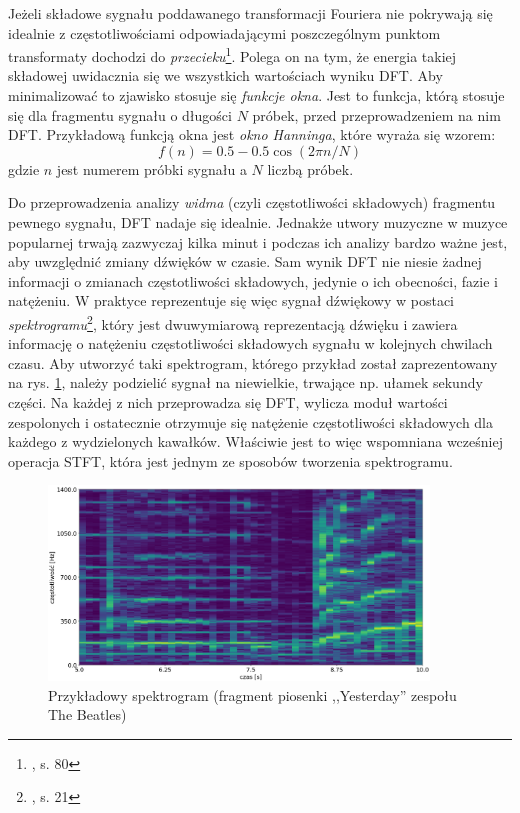 Jeżeli składowe sygnału poddawanego transformacji Fouriera nie pokrywają się idealnie z częstotliwościami odpowiadającymi poszczególnym punktom transformaty dochodzi do \emph{przecieku}\footnote{\cite{lyons_wprowadzenie_2000}, s. 80}. Polega on na tym, że energia takiej składowej uwidacznia się we wszystkich wartościach wyniku DFT. Aby minimalizować to zjawisko stosuje się \emph{funkcje okna}. Jest to funkcja, którą stosuje się dla fragmentu sygnału o długości $N$ próbek, przed przeprowadzeniem na nim DFT. Przykładową funkcją okna jest \emph{okno Hanninga}, które wyraża się wzorem:
\begin{equation}
    f(n) = 0.5 - 0.5 \cos (2 \pi n / N)
\end{equation}
gdzie $n$ jest numerem próbki sygnału a $N$ liczbą próbek.

Do przeprowadzenia analizy \emph{widma} (czyli częstotliwości składowych) fragmentu pewnego sygnału, DFT nadaje się idealnie. Jednakże utwory muzyczne w muzyce popularnej trwają zazwyczaj kilka minut i podczas ich analizy bardzo ważne jest, aby uwzględnić zmiany dźwięków w czasie. Sam wynik DFT nie niesie żadnej informacji o zmianach częstotliwości składowych, jedynie o ich obecności, fazie i natężeniu.  W praktyce reprezentuje się więc sygnał dźwiękowy w postaci \emph{spektrogramu}\footnote{\cite{lerch_introduction_2012}, s. 21}, który jest dwuwymiarową reprezentacją dźwięku i zawiera informację o natężeniu częstotliwości składowych sygnału w kolejnych chwilach czasu. Aby utworzyć taki spektrogram, którego przykład został zaprezentowany na rys.  \ref{fig:spektrogram}, należy podzielić sygnał na niewielkie, trwające np. ułamek sekundy części. Na każdej z nich przeprowadza się DFT, wylicza moduł wartości zespolonych i ostatecznie otrzymuje się natężenie częstotliwości składowych dla każdego z wydzielonych kawałków. Właściwie jest to więc wspomniana wcześniej operacja STFT, która jest jednym ze sposobów tworzenia spektrogramu.

\begin{figure}[htb]
    \centering
    \includegraphics[width=0.9\textwidth]{images/spektrogram}
    \caption{Przykładowy spektrogram (fragment piosenki ,,Yesterday'' zespołu The Beatles)}
    \label{fig:spektrogram}
\end{figure}



